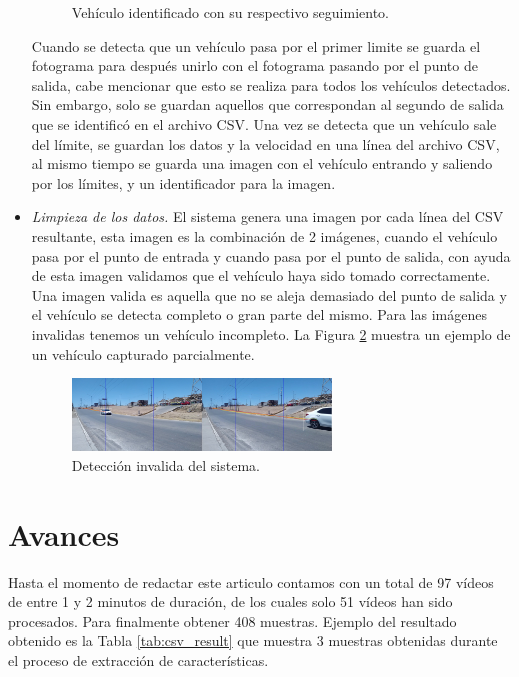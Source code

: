 \documentclass{llncs}
\begin{document}
\begin{itemize}
\begin{figure}[H]
    \centering
    \caption{Vehículo identificado con su respectivo seguimiento.}
    \label{img:Tracking}
\end{figure}
Cuando se detecta que un vehículo pasa por el primer limite se guarda el fotograma para después unirlo con el fotograma pasando por el punto de salida, cabe mencionar que esto se realiza para todos los vehículos detectados. Sin embargo, solo se guardan aquellos que correspondan al segundo de salida que se identificó en el archivo CSV. Una vez se detecta que un vehículo sale del límite, se guardan los datos y la velocidad en una línea del archivo CSV, al mismo tiempo se guarda una imagen con el vehículo entrando y saliendo por los límites, y un identificador para la imagen.
\item \textit{Limpieza de los datos.} El sistema genera una imagen por cada línea del CSV resultante, esta imagen es la combinación de 2 imágenes, cuando el vehículo pasa por el punto de entrada y cuando pasa por el punto de salida, con ayuda de esta imagen validamos que el vehículo haya sido tomado correctamente. Una imagen valida es aquella que no se aleja demasiado del punto de salida y el vehículo se detecta completo o gran parte del mismo.
Para las imágenes invalidas tenemos un vehículo incompleto. La Figura \ref{img:invalid} muestra un ejemplo de un vehículo capturado parcialmente.
\begin{figure}[H]
    \includegraphics[width=0.65\textwidth]{imgs/img_no_valid.jpg}
    \centering
    \caption{Detección invalida del sistema.}
    \label{img:invalid}
\end{figure}
\end{itemize}
\section{Avances}

Hasta el momento de redactar este articulo contamos con un total de 97 vídeos de entre 1 y 2 minutos de duración, de los cuales solo 51 vídeos han sido procesados. Para finalmente obtener 408 muestras. Ejemplo del resultado obtenido es la Tabla \ref{tab:csv_result} que muestra 3 muestras obtenidas durante el proceso de extracción de características. 
\end{document}
